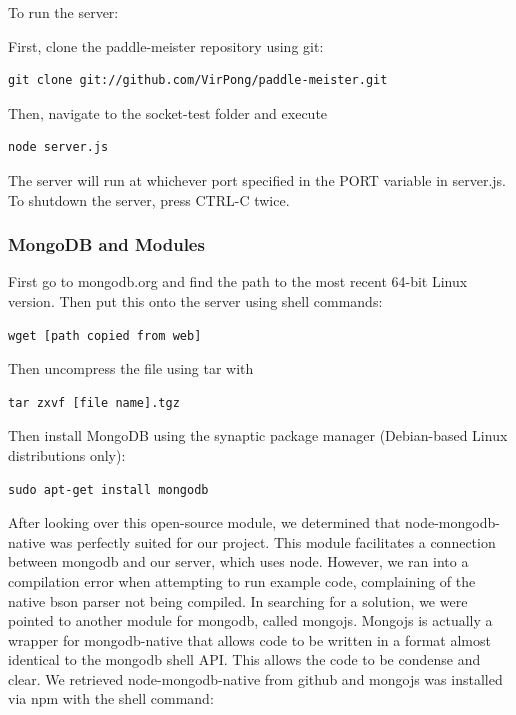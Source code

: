 \documentclass[letterpaper,12pt]{article}
\begin{document}
To run the server:

First, clone the paddle-meister repository using git:

\begin{verbatim}
git clone git://github.com/VirPong/paddle-meister.git
\end{verbatim}

Then, navigate to the socket-test folder and execute

\begin{verbatim}
node server.js
\end{verbatim}

The server will run at whichever port specified in the PORT variable in server.js. To shutdown the server, press CTRL-C twice.

\subsubsection{MongoDB and Modules}
First go to mongodb.org and find the path to the most recent 64-bit Linux version. Then put this onto the server using shell commands:

\begin{verbatim}
wget [path copied from web]
\end{verbatim}
Then uncompress the file using tar with

\begin{verbatim}
tar zxvf [file name].tgz
\end{verbatim}

Then install MongoDB using the synaptic package manager (Debian-based Linux distributions only):
\begin{verbatim}
sudo apt-get install mongodb
\end{verbatim}

After looking over this open-source module, we determined that node-mongodb-native was perfectly suited for our project. This module facilitates a connection between mongodb and our server, which uses node. However, we ran into a compilation error when attempting to run example code, complaining of the native bson parser not being compiled.
In searching for a solution, we were pointed to another module for mongodb, called mongojs. Mongojs is actually a wrapper for mongodb-native that allows code to be written in a format almost identical to the mongodb shell API. This allows the code to be condense and clear.
We retrieved node-mongodb-native from github and mongojs was installed via npm with the shell command:
\end{document}
